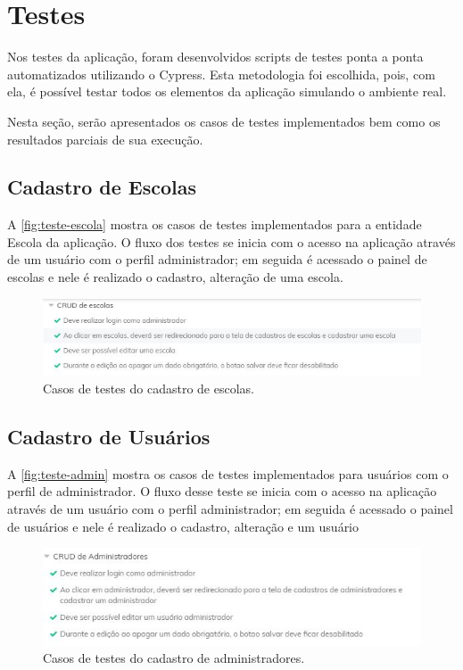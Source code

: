 \section{Testes}
Nos testes da aplicação, foram desenvolvidos scripts de testes ponta a ponta automatizados utilizando o Cypress. Esta metodologia foi escolhida, pois, com ela, é possível testar todos os elementos da aplicação simulando o ambiente real. 

Nesta seção, serão apresentados os casos de testes implementados bem como os resultados parciais de sua execução.


\subsection{Cadastro de Escolas}
A \autoref{fig:teste-escola} mostra os casos de testes implementados para a entidade Escola da aplicação. O fluxo dos testes se inicia com o acesso na aplicação através de um usuário com o perfil administrador; em seguida é acessado o painel de escolas e nele é realizado o cadastro, alteração de uma escola.

\begin{figure}[htb]
    \centering
	\includegraphics[width=16cm]{imagens/tstEscola.JPG}
	\caption{\label{fig:teste-escola} Casos de testes do cadastro de escolas.}
\end{figure}

\subsection{Cadastro de Usuários}
A \autoref{fig:teste-admin} mostra os casos de testes implementados para usuários com o perfil de administrador. O fluxo desse teste se inicia com o acesso na aplicação através de um usuário com o perfil administrador; em seguida é acessado o painel de usuários e nele é realizado o cadastro, alteração e um usuário

\begin{figure}[htb]
    \centering
	\includegraphics[width=16cm]{imagens/tstAdmin.JPG}
	\caption{\label{fig:teste-admin} Casos de testes do cadastro de administradores.}
\end{figure}

